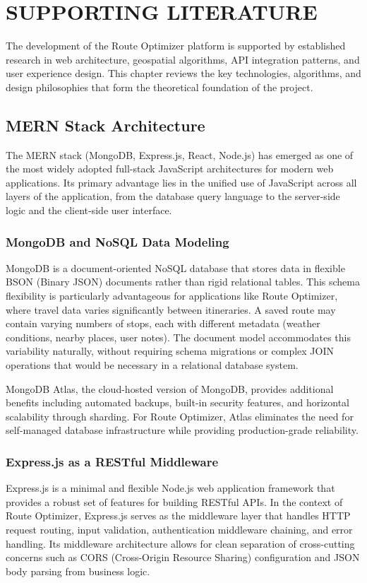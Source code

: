 \chapter{SUPPORTING LITERATURE}
The development of the Route Optimizer platform is supported by established research in web architecture, geospatial algorithms, API integration patterns, and user experience design. This chapter reviews the key technologies, algorithms, and design philosophies that form the theoretical foundation of the project.

\section{MERN Stack Architecture}
The MERN stack (MongoDB, Express.js, React, Node.js) has emerged as one of the most widely adopted full-stack JavaScript architectures for modern web applications. Its primary advantage lies in the unified use of JavaScript across all layers of the application, from the database query language to the server-side logic and the client-side user interface.

\subsection{MongoDB and NoSQL Data Modeling}
MongoDB is a document-oriented NoSQL database that stores data in flexible BSON (Binary JSON) documents rather than rigid relational tables. This schema flexibility is particularly advantageous for applications like Route Optimizer, where travel data varies significantly between itineraries. A saved route may contain varying numbers of stops, each with different metadata (weather conditions, nearby places, user notes). The document model accommodates this variability naturally, without requiring schema migrations or complex JOIN operations that would be necessary in a relational database system.

MongoDB Atlas, the cloud-hosted version of MongoDB, provides additional benefits including automated backups, built-in security features, and horizontal scalability through sharding. For Route Optimizer, Atlas eliminates the need for self-managed database infrastructure while providing production-grade reliability.

\subsection{Express.js as a RESTful Middleware}
Express.js is a minimal and flexible Node.js web application framework that provides a robust set of features for building RESTful APIs. In the context of Route Optimizer, Express.js serves as the middleware layer that handles HTTP request routing, input validation, authentication middleware chaining, and error handling. Its middleware architecture allows for clean separation of cross-cutting concerns such as CORS (Cross-Origin Resource Sharing) configuration and JSON body parsing from business logic.

